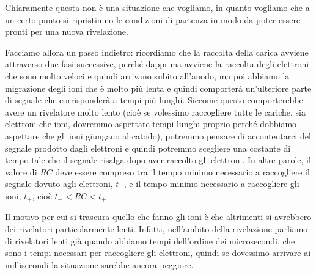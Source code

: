 Chiaramente questa non è una situazione che vogliamo, in quanto vogliamo che a un certo punto si ripristinino le condizioni di partenza in modo da poter essere pronti per una nuova rivelazione.

Facciamo allora un passo indietro: ricordiamo che la raccolta della carica avviene attraverso due fasi successive, perché dapprima avviene la raccolta degli elettroni che sono molto veloci e quindi arrivano subito all'anodo, ma poi abbiamo la migrazione degli ioni che è molto più lenta e quindi comporterà un'ulteriore parte di segnale che corrisponderà a tempi più lunghi. Siccome questo comporterebbe avere un rivelatore molto lento (cioè se volessimo raccogliere tutte le cariche, sia elettroni che ioni, dovremmo aspettare tempi lunghi proprio perché dobbiamo aspettare che gli ioni giungano al catodo), potremmo pensare di accontentarci del segnale prodotto dagli elettroni e quindi potremmo scegliere una costante di tempo tale che il segnale risalga dopo aver raccolto gli elettroni. In altre parole, il valore di $RC$ deve essere compreso tra il tempo minimo necessario a raccogliere il segnale dovuto agli elettroni, $t_{-}$, e il tempo minimo necessario a raccogliere gli ioni, $t_{+}$, cioè $t_{-} < RC < t_{+}$.

Il motivo per cui si trascura quello che fanno gli ioni è che altrimenti si avrebbero dei rivelatori particolarmente lenti. Infatti, nell'ambito della rivelazione parliamo di rivelatori lenti già quando abbiamo tempi dell'ordine dei microsecondi, che sono i tempi necessari per raccogliere gli elettroni, quindi se dovessimo arrivare ai millisecondi la situazione sarebbe ancora peggiore.

\begin{figure}[H]
   \centering
\end{figure}

